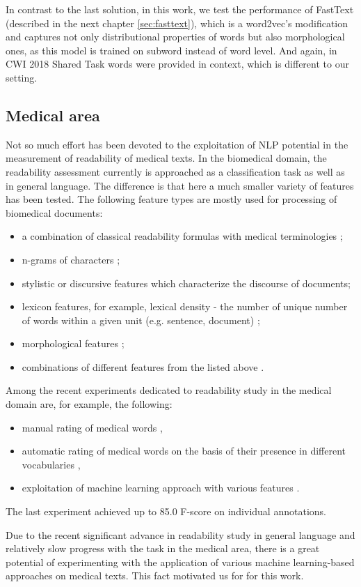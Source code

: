 In contrast to the last solution, in this work, we test the performance of FastText (described in the next chapter \ref{sec:fasttext}), which is a word2vec's modification and captures not only distributional properties of words but also morphological ones, as this model is trained on subword instead of word level. And again, in  CWI 2018 Shared Task words were provided in context, which is different to our setting.


\subsection{Medical area}
Not so much effort has been devoted to the exploitation of NLP potential in the measurement of readability of medical texts.
In the biomedical domain, the readability assessment currently is approached as a classification task as well as in general language. The difference is that here a much smaller variety of features has been tested. The following feature types are mostly used for processing of biomedical documents:
\begin{itemize}
    \item a combination of classical readability formulas
with medical terminologies \citep{Kokkinakis-2006};
    \item n-grams of characters \citep{Poprat-MIE2006}; 
    \item stylistic \citep{Grabar-AMIA2007} or discursive \citep{Goeuriot-LREC2008} features which characterize the discourse of documents;
    \item lexicon features, for example, lexical density - the number of unique number of words within a given unit (e.g. sentence, document) \citep{Miller-HICSS2007};
    \item morphological features \citep{Chmielik-TAL2011};
    \item combinations of different features from the listed above
    \citep{Zeng-MEDINFO2007}.
\end{itemize}

Among the recent experiments dedicated to readability study in the medical domain are, for example, the following: 
\begin{itemize}
    \item manual rating of medical words \citep{Zheng-AMIA2002},
    \item automatic rating of medical words on the basis of their presence in different vocabularies \citep{Borst-MIE2008},
    \item exploitation of machine learning approach
    with various features \citep{Grabar-PITR2014}.
\end{itemize}
The last experiment achieved up to 85.0 F-score on individual annotations.

\bigskip
Due to the recent significant advance in readability study in general language and relatively slow progress with the task in the medical area, there is a great potential of experimenting with the application of various machine learning-based approaches on medical texts. This fact motivated us for for this work.
